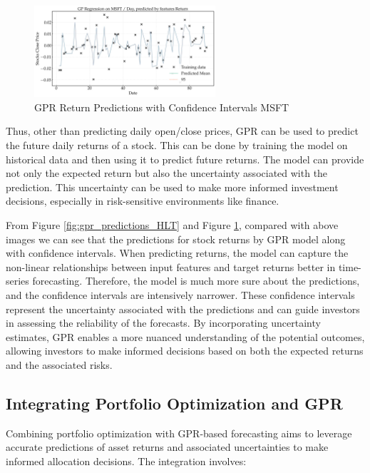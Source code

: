 \begin{figure}[h]
    \centering
    \includegraphics[width=0.6\textwidth]{figures/future_predictions_MSFT_return.png}
    \caption{GPR Return Predictions with Confidence Intervals MSFT}
    \label{fig:gpr_predictions_MSFT}
\end{figure}

Thus, other than predicting daily open/close prices, GPR can be used to predict the future daily returns of a stock. This can be done by training the model on historical data and then using it to predict future returns. The model can provide not only the expected return but also the uncertainty associated with the prediction. This uncertainty can be used to make more informed investment decisions, especially in risk-sensitive environments like finance.

From Figure \ref{fig:gpr_predictions_HLT} and Figure \ref{fig:gpr_predictions_MSFT}, compared with above images we can see that the predictions for stock returns by GPR model along with confidence intervals. When predicting returns, the model can capture the non-linear relationships between input features and target returns better in time-series forecasting. Therefore, the model is much more sure about the predictions, and the confidence intervals are intensively narrower.
These confidence intervals represent the uncertainty associated with the predictions and can guide investors in assessing the reliability of the forecasts. By incorporating uncertainty estimates, GPR enables a more nuanced understanding of the potential outcomes, allowing investors to make informed decisions based on both the expected returns and the associated risks.
\subsection{Integrating Portfolio Optimization and \ac{GPR}}

Combining portfolio optimization with GPR-based forecasting aims to leverage accurate predictions of asset returns and associated uncertainties to make informed allocation decisions. The integration involves:

